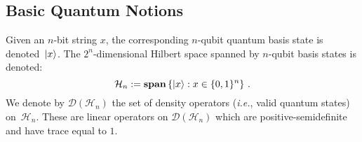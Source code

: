 \begin{definition}
\subsection{Basic Quantum Notions}
\label{sec:quantum-prelims}
Given an $n$-bit string $x$, the corresponding  $n$-qubit quantum basis state is denoted~${\lvert}x\rangle$. The $2^n$-dimensional Hilbert space spanned by $n$-qubit basis states is denoted:
\begin{equation}
\label{eq:hilbert-space}
\mathcal{H}_n := \textbf{span} \left\{ {\lvert}x\rangle : x \in \{0,1\}^{n} \right\}\,.
\end{equation}
We denote by $\mathcal{D}(\mathcal{H}_n)$ the set of density operators (\emph{i.e.}, valid quantum states) on~$\mathcal{H}_n$. These are linear operators on $\mathcal{D}(\mathcal{H}_n)$ which are positive-semidefinite and have trace equal to $1.$





\end{definition}
